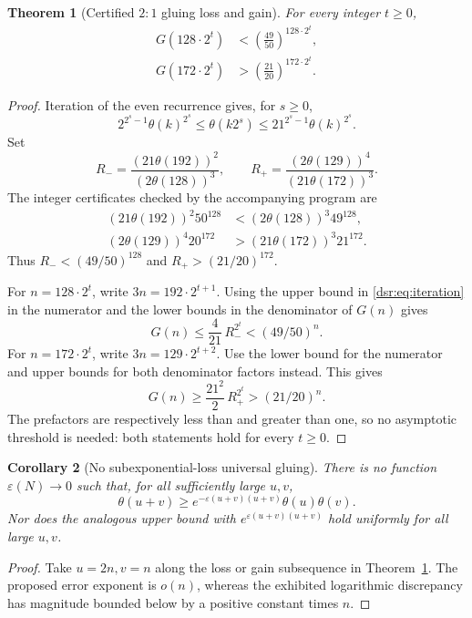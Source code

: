 \documentclass[11pt,a4paper]{article}
\numberwithin{equation}{section}
\newtheorem{theorem}{Theorem}[section]
\newtheorem{corollary}[theorem]{Corollary}
\theoremstyle{definition}
\theoremstyle{remark}
\theoremstyle{definition}
\theoremstyle{plain}
\begin{document}
\begin{theorem}[Certified $2{:}1$ gluing loss and gain]
\label{dsr:thm:explicit-gluing}
For every integer $t\ge0$,
\begin{align}
 G(128\cdot2^t)&<\left(\frac{49}{50}\right)^{128\cdot2^t},
 \label{dsr:eq:explicit-loss}\\
 G(172\cdot2^t)&>\left(\frac{21}{20}\right)^{172\cdot2^t}.
 \label{dsr:eq:explicit-gain}
\end{align}
\end{theorem}
\begin{proof}
Iteration of the even recurrence gives, for $s\ge0$,
\begin{equation}
 2^{2^s-1}\theta(k)^{2^s}\le\theta(k2^s)
 \le21^{2^s-1}\theta(k)^{2^s}.
\label{dsr:eq:iteration}
\end{equation}
Set
\begin{equation}
 R_- =\frac{(21\theta(192))^2}{(2\theta(128))^3},\qquad
 R_+ =\frac{(2\theta(129))^4}{(21\theta(172))^3}.
\end{equation}
The integer certificates checked by the accompanying program are
\begin{align}
 (21\theta(192))^2 50^{128}
  &<(2\theta(128))^3 49^{128},\label{dsr:eq:loss-cert}\\
 (2\theta(129))^4 20^{172}
  &>(21\theta(172))^3 21^{172}.\label{dsr:eq:gain-cert}
\end{align}
Thus $R_-<(49/50)^{128}$ and $R_+>(21/20)^{172}$.

For $n=128\cdot2^t$, write $3n=192\cdot2^{t+1}$. Using the upper bound in
\eqref{dsr:eq:iteration} in the numerator and the lower bounds in the denominator
of $G(n)$ gives
\begin{equation}
 G(n)\le\frac4{21}\,R_-^{2^t}
       <(49/50)^n.
\end{equation}
For $n=172\cdot2^t$, write $3n=129\cdot2^{t+2}$. Use the lower bound for the
numerator and upper bounds for both denominator factors instead. This gives
\begin{equation}
 G(n)\ge\frac{21^2}{2}\,R_+^{2^t}
       >(21/20)^n.
\end{equation}
The prefactors are respectively less than and greater than one, so no
asymptotic threshold is needed: both statements hold for every $t\ge0$.
\end{proof}

\begin{corollary}[No subexponential-loss universal gluing]
There is no function $\varepsilon(N)\to0$ such that, for all sufficiently
large $u,v$,
\begin{equation}
 \theta(u+v)\ge e^{-\varepsilon(u+v)(u+v)}\theta(u)\theta(v).
\end{equation}
Nor does the analogous upper bound with $e^{\varepsilon(u+v)(u+v)}$ hold
uniformly for all large $u,v$.
\end{corollary}
\begin{proof}
Take $u=2n,v=n$ along the loss or gain subsequence in
Theorem~\ref{dsr:thm:explicit-gluing}. The proposed error exponent is $o(n)$,
whereas the exhibited logarithmic discrepancy has magnitude bounded below
by a positive constant times $n$.
\end{proof}
\end{document}
